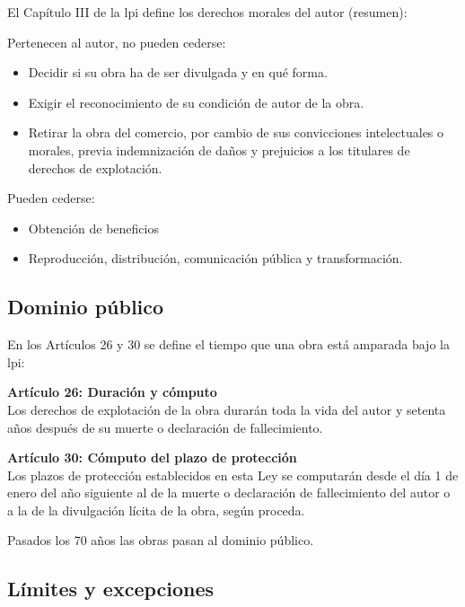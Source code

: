 El Capítulo III de la \gls{lpi} define los derechos morales del autor (resumen):

Pertenecen al autor, no pueden cederse:
\begin{itemize}
    \item Decidir si su obra ha de ser divulgada y en qué forma.
    \item Exigir el reconocimiento de su condición de autor de la obra.
    \item Retirar la obra del comercio, por cambio de sus convicciones intelectuales o morales, previa indemnización de daños y prejuicios a los titulares de derechos de explotación.
\end{itemize}

Pueden cederse:
\begin{itemize}
    \item Obtención de beneficios
    \item Reproducción, distribución, comunicación pública y transformación.
\end{itemize}


\subsection{Dominio público}

En los Artículos 26 y 30 se define el tiempo que una obra está amparada bajo la \gls{lpi}:

\textbf{Artículo 26: Duración y cómputo}\\
Los derechos de explotación de la obra durarán toda la vida del autor y setenta años después de su muerte o declaración de fallecimiento.

\textbf{Artículo 30: Cómputo del plazo de protección}\\
Los plazos de protección establecidos en esta Ley se computarán desde el día 1 de enero del año siguiente al de la muerte o declaración de fallecimiento del autor o a la de la divulgación lícita de la obra, según proceda.

Pasados los 70 años las obras pasan al dominio público.

\subsection{Límites y excepciones}

